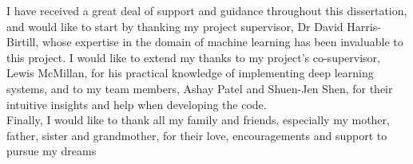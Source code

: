 I have received a great deal of support and guidance throughout this dissertation, and would like to start by thanking my project supervisor, Dr David Harris-Birtill, whose expertise in the domain of machine learning has been invaluable to this project. I would like to extend my thanks to my project's co-supervisor, Lewis McMillan, for his practical knowledge of implementing deep learning systems, and to my team members, Ashay Patel and Shuen-Jen Shen, for their intuitive insights and help when developing the code.\\

Finally, I would like to thank all my family and friends, especially my mother, father, sister and grandmother, for their love, encouragements and support to pursue my dreams
